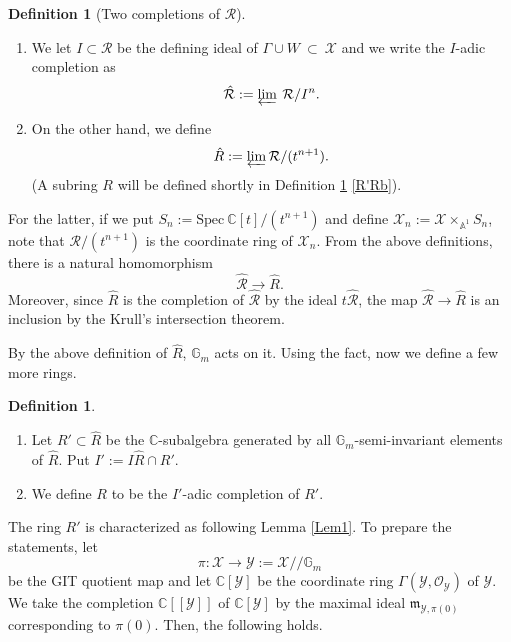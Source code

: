\documentclass[12pt,a4paper]{amsart}
\theoremstyle{remark}
\theoremstyle{definition}
\newtheorem{defn}[Thm]{Definition}
\def\C{\mathbb{C}}
\def\G{\mathbb{G}}
\def\A{\mathbb{A}}
\begin{document}
\begin{defn}[Two completions of $\mathcal{R}$]
\begin{enumerate}
\item 
We let $I \subset \mathcal{R}$ be the defining ideal of $\Gamma \cup  W \: \subset \: \mathcal{X}$ 
and we write the $I$-adic completion as 
\begin{align*}
\hat{\mathcal R} := \varprojlim\: \mathcal{R}/I^n.
\end{align*}

\item 
On the other hand, 
we define $$\hat{R} := \varprojlim \mathcal{R}/(t^{n+1}).$$ 
(A subring $R$ will be defined shortly in Definition \ref{R'R}  
\eqref{R'Rb}). 

\end{enumerate}
\end{defn}

For the latter, 
if we put $S_n := \mathrm{Spec}\: \C [t]/(t^{n+1})$ and define $\mathcal{X}_n := \mathcal{X} \times_{\A^1}S_n$, note that $\mathcal{R}/(t^{n+1})$ is 
the coordinate ring of $\mathcal{X}_n$. 
From the above definitions, there is a natural homomorphism 
$$\hat{\mathcal R} \to \hat{R}.$$ 
Moreover, since $\hat{R}$ is the completion of $\hat{\mathcal R}$ by the ideal $t\hat{\mathcal R}$, the map 
$\hat{\mathcal R} \to \hat{R}$ is an inclusion by the Krull's intersection theorem. \vspace{0.2cm}



By the above definition of $\hat{R}$, $\G_m$ acts on it. 
Using the fact, now we define a few more rings. 
\begin{defn}\label{R'R}
\begin{enumerate}[label=(\alph*)]
    \item 

Let $R' \subset \hat{R}$ be the $\C$-subalgebra generated by 
all $\mathbb{G}_m$-semi-invariant elements of $\hat{R}$. Put $I' := I\hat{R}  \cap R'$. 

\item \label{R'Rb}
We define $R$ to be the $I'$-adic  completion of $R'$. 
\end{enumerate}    
\end{defn}

The ring  $R'$ is characterized as following Lemma \ref{Lem1}. 
To prepare the statements, let 
$$\pi\colon \mathcal{X} \to \mathcal{Y} := \mathcal{X}//\G_m$$ be the GIT quotient map and let 
$\C[\mathcal{Y}]$ be the coordinate ring 
$\Gamma(\mathcal{Y},\mathcal{O}_{\mathcal{Y}})$  
of $\mathcal{Y}$. We take the completion $\C[[\mathcal{Y}]]$ of 
$\C[\mathcal{Y}]$ by the maximal ideal 
$\mathfrak{m}_{\mathcal{Y},\pi(0)}$ corresponding to $\pi (0)$. 
Then, the following holds. 
\end{document}

